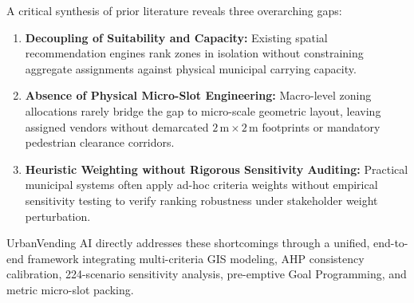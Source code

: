 A critical synthesis of prior literature reveals three overarching gaps:
\begin{enumerate}
    \item \textbf{Decoupling of Suitability and Capacity:} Existing spatial recommendation engines rank zones in isolation without constraining aggregate assignments against physical municipal carrying capacity.
    \item \textbf{Absence of Physical Micro-Slot Engineering:} Macro-level zoning allocations rarely bridge the gap to micro-scale geometric layout, leaving assigned vendors without demarcated $2\,\text{m}\times 2\,\text{m}$ footprints or mandatory pedestrian clearance corridors.
    \item \textbf{Heuristic Weighting without Rigorous Sensitivity Auditing:} Practical municipal systems often apply ad-hoc criteria weights without empirical sensitivity testing to verify ranking robustness under stakeholder weight perturbation.
\end{enumerate}

UrbanVending AI directly addresses these shortcomings through a unified, end-to-end framework integrating multi-criteria GIS modeling, AHP consistency calibration, 224-scenario sensitivity analysis, pre-emptive Goal Programming, and metric micro-slot packing.
